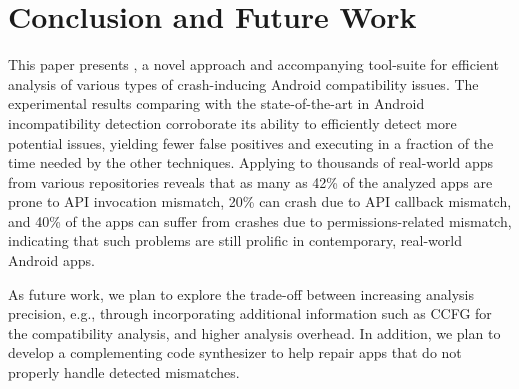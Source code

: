 \section{Conclusion and Future Work}\label{sec-conclusion}

This paper presents \@approach, a novel approach and
accompanying tool-suite for efficient analysis of various
types of crash-inducing Android compatibility issues.  The
experimental results comparing \@approach with the
state-of-the-art in Android incompatibility detection
corroborate its ability to efficiently detect more potential issues, yielding fewer false positives and
executing in a fraction of the time needed by the other
techniques.  Applying \@approach to thousands of real-world
apps from various repositories reveals that as many as 42\%
of the analyzed apps are prone to API invocation mismatch,
20\% can crash due to API callback mismatch, and 40\% of the
apps can suffer from crashes due to permissions-related
mismatch, indicating that such problems are still prolific
in contemporary, real-world Android apps. 

As future work, we plan  to explore the trade-off between increasing analysis precision, e.g.,
through incorporating additional information such as CCFG for the compatibility analysis, and higher analysis overhead. In addition, we plan to develop a complementing code synthesizer to help repair apps that do not properly handle detected mismatches. 

\begin{comment}
\commentcs{
We also plan to develop new detectors to identify other events that can lead to dependability and security issues. 
Another idea
is to provide guidance to users to replace the use of
possibly outdated or deprecated APIs with more updated
ones.  For example, our system can recommend a
developer to replace the old SSL API with the new one.
While the old one still works,  it is less secure than
the newer API.
}
\end{comment}
 

 
